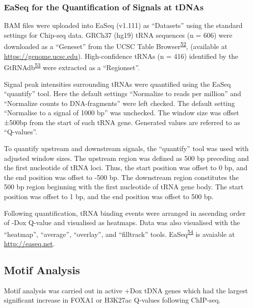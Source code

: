 \documentclass[
  12pt,
]{article}
\begin{document}
\hypertarget{easeq-for-the-quantification-of-signals-at-tdnas}{%
\subsubsection{EaSeq for the Quantification of Signals at tDNAs}\label{easeq-for-the-quantification-of-signals-at-tdnas}}

BAM files were uploaded into EaSeq (v1.111) as ``Datasets'' using the standard settings for Chip-seq data.
GRCh37 (hg19) tRNA sequences (n = 606) were downloaded as a ``Geneset'' from the UCSC Table Browser\textsuperscript{\protect\hyperlink{ref-Karolchik2004}{52}}, (available at \url{https://genome.ucsc.edu}).
High-confidence tRNAs (n = 416) identified by the GtRNAdb\textsuperscript{\protect\hyperlink{ref-Chan2016}{53}} were extracted as a ``Regionset''.

Signal peak intensities surrounding tRNAs were quantified using the EaSeq ``quantify'' tool.
Here the default settings ``Normalize to reads per million'' and ``Normalize counts to DNA-fragments'' were left checked.
The default setting ``Normalise to a signal of 1000 bp'' was unchecked.
The window size was offset ±500bp from the start of each tRNA gene.
Generated values are referred to as ``Q-values''.

To quantify upstream and downstream signals, the ``quantify'' tool was used with adjusted window sizes.
The upstream region was defined as 500 bp preceding and the first nucleotide of tRNA loci.
Thus, the start position was offset to 0 bp, and the end position was offset to -500 bp.
The downstream region constitutes the 500 bp region beginning with the first nucleotide of tRNA gene body.
The start position was offset to 1 bp, and the end position was offset to 500 bp.

Following quantification, tRNA binding events were arranged in ascending order of -Dox Q-value and visualised as heatmaps.
Data was also visualised with the ``heatmap'', ``average'', ``overlay'', and ``filltrack'' tools.
EaSeq\textsuperscript{\protect\hyperlink{ref-lerdrup2016}{54}} is avaiable at \url{http://easeq.net}.

\hypertarget{motif-analysis}{%
\subsection{Motif Analysis}\label{motif-analysis}}

Motif analysis was carried out in active +Dox tDNA genes which had the largest significant increase in FOXA1 or H3K27ac Q-values following ChIP-seq.
\end{document}
